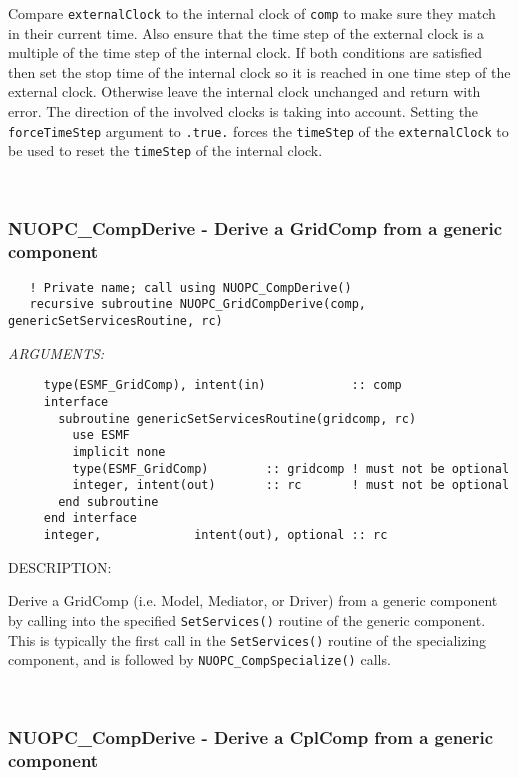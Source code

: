      Compare {\tt externalClock} to the internal clock of {\tt comp} to make sure
     they match in their current time. Also ensure that the time step of the 
     external clock is a multiple of the time step of the internal clock. If 
     both conditions are satisfied then set the stop time of the internal clock
     so it is reached in one time step of the external clock. Otherwise leave the
     internal clock unchanged and return with error. The direction of
     the involved clocks is taking into account.
     Setting the {\tt forceTimeStep} argument to {\tt .true.} forces the 
     {\tt timeStep} of the {\tt externalClock} to be used to reset the
     {\tt timeStep} of the internal clock. 
 
\mbox{}\hrulefill\ 
 
\subsubsection [NUOPC\_CompDerive] {NUOPC\_CompDerive - Derive a GridComp from a generic component}


\begin{verbatim}   ! Private name; call using NUOPC_CompDerive() 
   recursive subroutine NUOPC_GridCompDerive(comp, genericSetServicesRoutine, rc)\end{verbatim}{\em ARGUMENTS:}
\begin{verbatim}     type(ESMF_GridComp), intent(in)            :: comp
     interface
       subroutine genericSetServicesRoutine(gridcomp, rc)
         use ESMF
         implicit none
         type(ESMF_GridComp)        :: gridcomp ! must not be optional
         integer, intent(out)       :: rc       ! must not be optional
       end subroutine
     end interface
     integer,             intent(out), optional :: rc\end{verbatim}
{\sf DESCRIPTION:\\ }


     Derive a GridComp (i.e. Model, Mediator, or Driver) from a generic 
     component by calling into the specified {\tt SetServices()} routine of the
     generic component. This is typically the first call in the
     {\tt SetServices()} routine of the specializing component, and is followed
     by {\tt NUOPC\_CompSpecialize()} calls. 
 
\mbox{}\hrulefill\ 
 
\subsubsection [NUOPC\_CompDerive] {NUOPC\_CompDerive - Derive a CplComp from a generic component}


